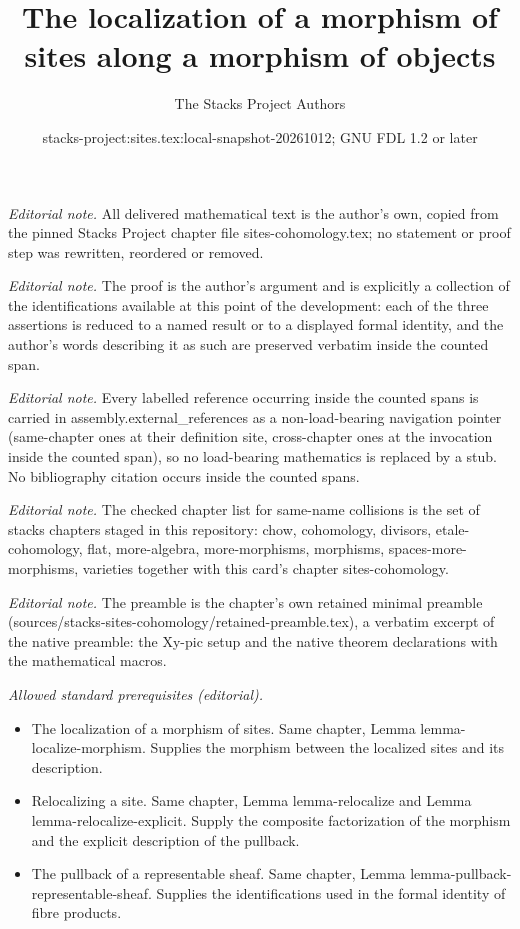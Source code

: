 \documentclass[10pt,a4paper]{amsart}
\title{The localization of a morphism of sites along a morphism of objects}
\author{The Stacks Project Authors}
\date{stacks-project:sites.tex:local-snapshot-20261012; GNU FDL 1.2 or later}
\theoremstyle{plain}
\theoremstyle{definition}
\theoremstyle{remark}
\numberwithin{equation}{subsection}
\begin{document}
\maketitle
\noindent\textit{Editorial note.} All delivered mathematical text is the author's own, copied from the pinned Stacks Project chapter file sites-cohomology.tex; no statement or proof step was rewritten, reordered or removed.\par\medskip
\noindent\textit{Editorial note.} The proof is the author's argument and is explicitly a collection of the identifications available at this point of the development: each of the three assertions is reduced to a named result or to a displayed formal identity, and the author's words describing it as such are preserved verbatim inside the counted span.\par\medskip
\noindent\textit{Editorial note.} Every labelled reference occurring inside the counted spans is carried in assembly.external\_references as a non-load-bearing navigation pointer (same-chapter ones at their definition site, cross-chapter ones at the invocation inside the counted span), so no load-bearing mathematics is replaced by a stub. No bibliography citation occurs inside the counted spans.\par\medskip
\noindent\textit{Editorial note.} The checked chapter list for same-name collisions is the set of stacks chapters staged in this repository: chow, cohomology, divisors, etale-cohomology, flat, more-algebra, more-morphisms, morphisms, spaces-more-morphisms, varieties together with this card's chapter sites-cohomology.\par\medskip
\noindent\textit{Editorial note.} The preamble is the chapter's own retained minimal preamble (sources/stacks-sites-cohomology/retained-preamble.tex), a verbatim excerpt of the native preamble: the Xy-pic setup and the native theorem declarations with the mathematical macros.\par\medskip
\noindent\textit{Allowed standard prerequisites (editorial).}\begin{itemize}
\item The localization of a morphism of sites. Same chapter, Lemma lemma-localize-morphism. Supplies the morphism between the localized sites and its description.
\item Relocalizing a site. Same chapter, Lemma lemma-relocalize and Lemma lemma-relocalize-explicit. Supply the composite factorization of the morphism and the explicit description of the pullback.
\item The pullback of a representable sheaf. Same chapter, Lemma lemma-pullback-representable-sheaf. Supplies the identifications used in the formal identity of fibre products.
\end{itemize}\medskip
\end{document}

